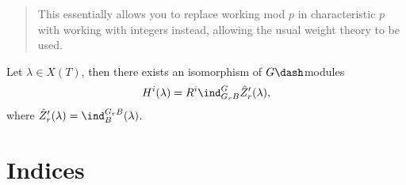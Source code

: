 \begin{quote}
This essentially allows you to replace working mod \(p\) in
characteristic \(p\) with working with integers instead, allowing the
usual weight theory to be used.
\end{quote}

\begin{proposition}[?]

Let \(\lambda \in X(T)\), then there exists an isomorphism of
\(G\dash\)modules
\begin{align*}  
H^i(\lambda) = R^i \ind_{G_r B}^G \hat{Z}_r ' (\lambda)
,\end{align*} where \(\hat{Z}_r'(\lambda) = \ind_B^{G_r B}(\lambda)\).

\end{proposition}

\newpage

\newpage
\section{Indices}

\renewcommand{\listtheoremname}{Definitions}
\listoftheorems[ignoreall,show={definition}, numwidth=3.5em]

\renewcommand{\listtheoremname}{Theorems}
\listoftheorems[ignoreall,show={theorem,proposition}, numwidth=3.5em]

\renewcommand{\listtheoremname}{Exercises}
\listoftheorems[ignoreall,show={exercise}, numwidth=3.5em]

\listoffigures


\printbibliography[title=Bibliography]



